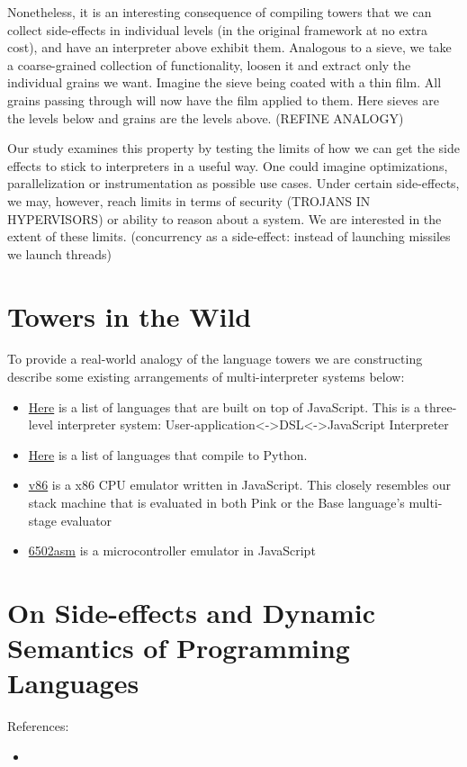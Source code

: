 \documentclass{article}
\begin{document}
Nonetheless, it is an interesting consequence of compiling towers that we can collect side-effects in individual levels (in the original framework at no extra cost), and have an interpreter
above exhibit them. Analogous to a sieve, we take a coarse-grained collection of functionality, loosen it and extract only the individual grains we want. Imagine the sieve being coated with a thin film. All grains passing through
will now have the film applied to them. Here sieves are the levels below and grains are the levels above. (REFINE ANALOGY)

Our study examines this property by testing the limits of how we can get the side effects to stick to interpreters in a useful way. One could imagine optimizations, parallelization or instrumentation as possible use cases. Under certain side-effects, we may, however,
reach limits in terms of security (TROJANS IN HYPERVISORS) or ability to reason about a system. We are interested in the extent of these limits. (concurrency as a side-effect: instead of launching missiles we launch threads)

\section{Towers in the Wild}
To provide a real-world analogy of the language towers we are constructing describe some existing arrangements of multi-interpreter systems below:
\begin{itemize}
	\item \href{https://github.com/jashkenas/coffeescript/wiki/List-of-languages-that-compile-to-JS}{Here} is a list of languages that are built on top of JavaScript. This is a three-level interpreter system: User-application<->DSL<->JavaScript Interpreter
	\item \href{https://github.com/vindarel/languages-that-compile-to-python#other-languages-that-target-the-python-platform}{Here} is a list of languages that compile to Python.
	\item \href{https://github.com/copy/v86}{v86} is a x86 CPU emulator written in JavaScript. This closely resembles our stack machine that is evaluated in both Pink or the Base language's multi-stage evaluator
	\item \href{http://6502asm.com/}{6502asm} is a microcontroller emulator in JavaScript
\end{itemize}

\section{On Side-effects and Dynamic Semantics of Programming Languages}
References:
\begin{itemize}
	\item 
\end{itemize}
\end{document}
